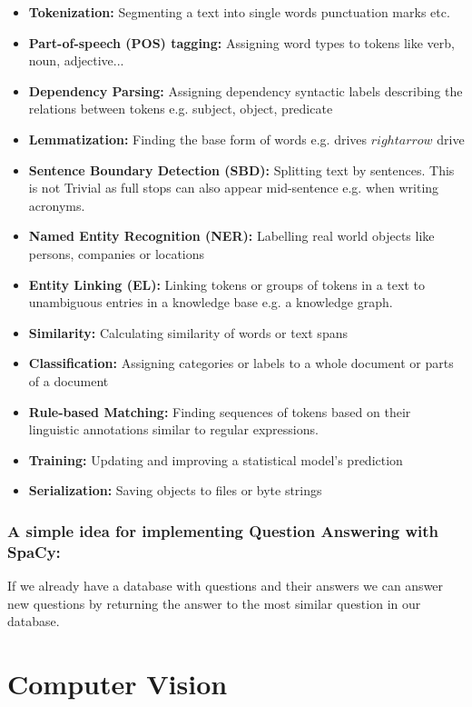 \begin{itemize}
    \item \textbf{Tokenization:} Segmenting a text into single words punctuation marks etc.
    \item \textbf{Part-of-speech (POS) tagging:} Assigning word types to tokens like verb, noun, adjective...
    \item \textbf{Dependency Parsing:} Assigning dependency syntactic labels describing the relations between tokens e.g. subject, object, predicate
    \item \textbf{Lemmatization:} Finding the base form of words e.g. drives $rightarrow$ drive
    \item \textbf{Sentence Boundary Detection (SBD):} Splitting text by sentences. This is not Trivial as full stops can also appear mid-sentence e.g. when writing acronyms.
    \item \textbf{Named Entity Recognition (NER):} Labelling real world objects like persons, companies or locations
    \item \textbf{Entity Linking (EL):} Linking tokens or groups of tokens in a text to unambiguous entries in a knowledge base e.g. a knowledge graph.
    \item \textbf{Similarity:} Calculating similarity of words or text spans
    \item \textbf{Classification:} Assigning categories or labels to a whole document or parts of a document
    \item \textbf{Rule-based Matching:} Finding sequences of tokens based on their linguistic annotations similar to regular expressions.
    \item \textbf{Training:} Updating and improving a statistical model's prediction
    \item \textbf{Serialization:} Saving objects to files or byte strings
\end{itemize}

\subsubsection*{A simple idea for implementing Question Answering with SpaCy:}
If we already have a database with questions and their answers we can answer new questions by returning the answer to the most similar question in our database.



\section{Computer Vision}

